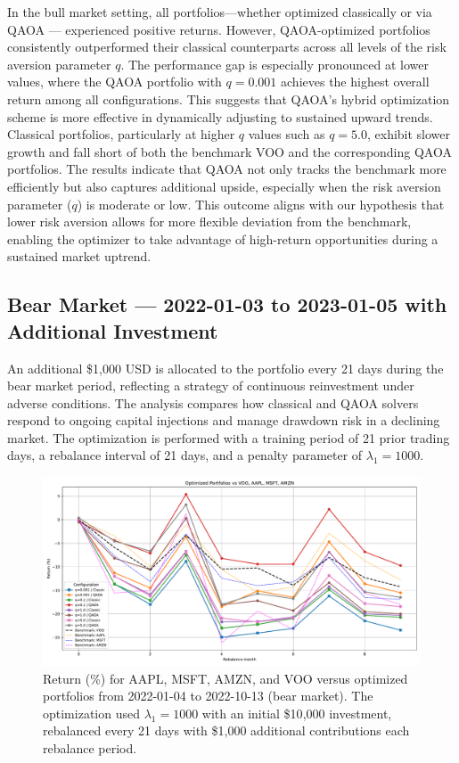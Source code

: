 \documentclass[12pt]{article}
\begin{document}
In the bull market setting, all portfolios—whether optimized classically or via QAOA — experienced positive returns. However, QAOA-optimized portfolios consistently outperformed their classical counterparts across all levels of the risk aversion parameter \( q \). The performance gap is especially pronounced at lower values, where the QAOA portfolio with \( q = 0.001 \) achieves the highest overall return among all configurations. This suggests that QAOA's hybrid optimization scheme is more effective in dynamically adjusting to sustained upward trends. Classical portfolios, particularly at higher \( q \) values such as \( q = 5.0 \), exhibit slower growth and fall short of both the benchmark VOO and the corresponding QAOA portfolios. The results indicate that QAOA not only tracks the benchmark more efficiently but also captures additional upside, especially when the risk aversion parameter (\( q \)) is moderate or low. This outcome aligns with our hypothesis that lower risk aversion allows for more flexible deviation from the benchmark, enabling the optimizer to take advantage of high-return opportunities during a sustained market uptrend.


\subsection{Bear Market — 2022-01-03 to 2023-01-05 with Additional Investment}

An additional \$1{,}000 USD is allocated to the portfolio every 21 days during the bear market period, reflecting a strategy of continuous reinvestment under adverse conditions. The analysis compares how classical and QAOA solvers respond to ongoing capital injections and manage drawdown risk in a declining market. The optimization is performed with a training period of 21 prior trading days, a rebalance interval of 21 days, and a penalty parameter of \(\lambda_1 = 1000\).

\begin{figure}[H]
    \centering
    \includegraphics[width=1.0\textwidth]{figures/_VOO_bb_bear_study_post_new_invest.pdf}
    \caption{Return (\%) for AAPL, MSFT, AMZN, and VOO versus optimized portfolios from 2022-01-04 to 2022-10-13 (bear market). The optimization used $\lambda_{1} = 1000$ with an initial \$10{,}000 investment, rebalanced every 21 days with \$1{,}000 additional contributions each rebalance period.}
    \label{fig:VOO_bb_bear_study_new_invest}
\end{figure}
\end{document}
